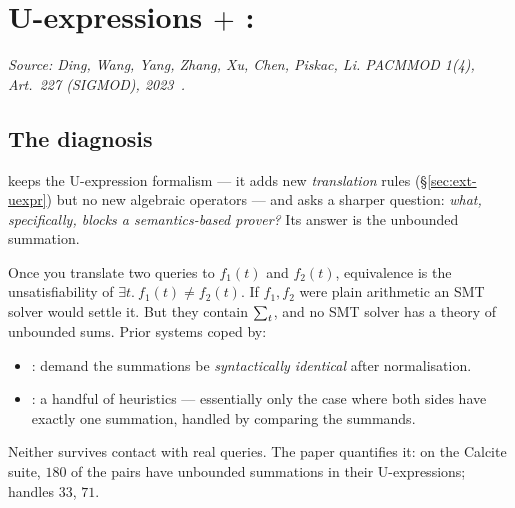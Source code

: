 \section{U-expressions $+$ \liastar{}: \sqlsolver{}}
\label{sec:lia}

\emph{Source: Ding, Wang, Yang, Zhang, Xu, Chen, Piskac, Li. PACMMOD 1(4), Art.\ 227
(SIGMOD), 2023~\cite{sqlsolver}.}

\subsection{The diagnosis}

\sqlsolver{} keeps the U-expression formalism --- it adds new \emph{translation} rules
(\S\ref{sec:ext-uexpr}) but no new algebraic operators --- and asks a sharper question:
\emph{what, specifically, blocks a semantics-based prover?} Its answer is the unbounded
summation.

Once you translate two queries to $f_1(t)$ and $f_2(t)$, equivalence is the
unsatisfiability of $\exists t.\ f_1(t)\neq f_2(t)$. If $f_1,f_2$ were plain arithmetic an
SMT solver would settle it. But they contain $\sum_{t}$, and no SMT solver has a theory of
unbounded sums. Prior systems coped by:

\begin{itemize}
\item \udp{}: demand the summations be \emph{syntactically identical} after normalisation.
\item \wetune{}: a handful of heuristics --- essentially only the case where both sides have
      exactly one summation, handled by comparing the summands.
\end{itemize}

Neither survives contact with real queries. The paper quantifies it: on the Calcite suite,
$180$ of the pairs have unbounded summations in their U-expressions; \udp{} handles $33$,
\wetune{} $71$.

